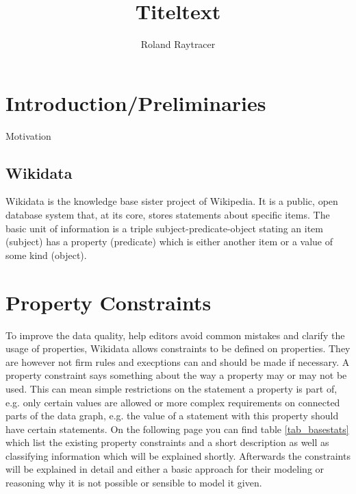 \documentclass[hyperref,bachelorofscience]{cgvpub}
\author{Roland Raytracer}
\title{Titeltext}
\begin{document}
\chapter{Introduction/Preliminaries}
Motivation
\cite{test}
\section{Wikidata}
Wikidata is the knowledge base sister project of Wikipedia. It is a public, open database system that, at its core, stores statements about specific items. The basic unit of information is a triple subject-predicate-object stating an item (subject) has a property (predicate) which is either another item or a value of some kind (object). 
\chapter{Property Constraints}
To improve the data quality, help editors avoid common mistakes and clarify the usage of properties, Wikidata allows constraints to be defined on properties. They are however not firm rules and execptions can and should be made if necessary. A property constraint says something about the way a property may or may not be used. This can mean simple restrictions on the statement a property is part of, e.g. only certain values are allowed or more complex requirements on connected parts of the data graph, e.g. the value of a statement with this property should have certain statements. On the following page you can find table \ref{tab_basestats} which list the existing property constraints and a short description as well as classifying information which will be explained shortly. Afterwards the constraints will be explained in detail and either a basic approach for their modeling or reasoning why it is not possible or sensible to model it given.\\
\end{document}
